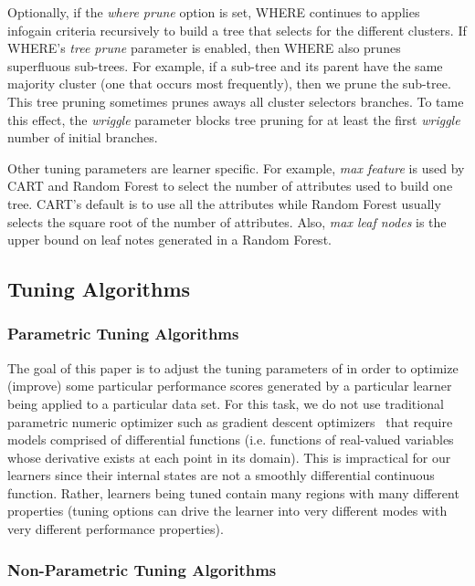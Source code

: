 Optionally, if the {\em where prune} option is set, 
WHERE  continues to applies infogain criteria  recursively to build a tree that selects for the
different clusters. If WHERE's {\em tree prune} parameter is enabled, then WHERE also prunes  superfluous sub-trees. For example, if a sub-tree and its parent have the same 
majority cluster
(one that occurs most frequently), then we prune the sub-tree.
This tree pruning  sometimes
prunes aways all  cluster selectors branches. To tame this effect, the {\em wriggle} parameter
blocks tree pruning for at least the first {\em wriggle} number of initial branches.

Other tuning parameters are learner specific. For example,
{\em max feature} is used by
CART and Random Forest to select the number of attributes
used to build one tree.
CART's default is to use all the attributes while 
Random Forest usually selects the square root of the number
of attributes.
Also,
  {\em max leaf nodes} is the upper bound on leaf notes generated in a 
  Random Forest.



\subsection{Tuning Algorithms}


 \subsubsection{Parametric Tuning Algorithms}
The  goal of this paper is to adjust the tuning parameters of 
in order to   optimize (improve) some particular performance scores
generated by a particular learner being applied to  a particular data set.
For this task, we do not use traditional parametric numeric optimizer  
such as  gradient descent optimizers~\cite{saltelli00} that require models comprised of
differential functions (i.e. functions of real-valued variables whose derivative exists at each point in its domain).
This is impractical  for  our learners since their internal states are   not a smoothly differential continuous function.
Rather, learners being tuned  contain many regions with many different properties (tuning options can
drive the learner into very different modes with very different performance properties).


 \subsubsection{Non-Parametric Tuning Algorithms}
 
